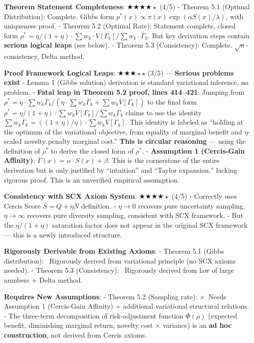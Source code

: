 \documentclass[
  12pt,
]{article}
\begin{document}
\textbf{Theorem Statement Completeness}: $\bigstar\bigstar\bigstar\bigstar{\scriptstyle\star}$ (4/5)
- Theorem 5.1 (Optimal Distribution): Complete. Gibbs form $p^*(x) \propto \pi(x)\exp(\alpha S(x)/\lambda)$, with uniqueness proof.
- Theorem 5.2 (Optimal Rate): Statement complete, closed form $\rho^* = \eta/(1+\eta)\cdot\sum w_k\cdot V[\Gamma_k]/\sum w_k\cdot\bar{\Gamma}_k$. But key derivation steps contain \textbf{serious logical leaps} (see below).
- Theorem 5.3 (Consistency): Complete. $\sqrt{n}$-consistency, Delta method.

\textbf{Proof Framework Logical Leaps}: $\bigstar\bigstar\bigstar{\scriptstyle\star}{\scriptstyle\star}$ (3/5) --- \textbf{Serious problems exist}
- Lemma 1 (Gibbs solution) derivation is standard variational inference, no problem.
- \textbf{Fatal leap in Theorem 5.2 proof, lines 414--421}: Jumping from $\rho^* = \eta\cdot\sum w_k\bar{\Gamma}_k/(\eta\cdot\sum w_k\bar{\Gamma}_k + \sum w_k V[\Gamma_k])$ to the final form $\rho^* = \eta/(1+\eta)\cdot\sum w_k V[\Gamma_k]/\sum w_k\bar{\Gamma}_k$ claims to use the identity $\sum w_k\bar{\Gamma}_k = ((1+\eta)/\eta)\cdot\sum w_k V[\Gamma_k]$. This identity is labeled as ``holding at the optimum of the variational objective, from equality of marginal benefit and $\eta$-scaled novelty penalty marginal cost.'' \textbf{This is circular reasoning} --- using the definition of $\rho^*$ to derive the closed form of $\rho^*$.
- \textbf{Assumption 1 (Cercis-Gain Affinity)}: $\bar{\Gamma}(x) = \alpha\cdot S(x) + \beta$. This is the cornerstone of the entire derivation but is only justified by ``intuition'' and ``Taylor expansion,'' lacking rigorous proof. This is an unverified empirical assumption.

\textbf{Consistency with SCX Axiom System}: $\bigstar\bigstar\bigstar\bigstar{\scriptstyle\star}$ (4/5)
- Correctly uses Cercis Score $S=Q+\eta N$ definition.
- $\eta\to 0$ recovers pure uncertainty sampling, $\eta\to\infty$ recovers pure diversity sampling, consistent with SCX framework.
- But the $\eta/(1+\eta)$ saturation factor does not appear in the original SCX framework --- this is a newly introduced structure.

\textbf{Rigorously Derivable from Existing Axioms}:
- Theorem 5.1 (Gibbs distribution): \checkmark\ Rigorously derived from variational principle (no SCX axioms needed).
- Theorem 5.3 (Consistency): \checkmark\ Rigorously derived from law of large numbers + Delta method.

\textbf{Requires New Assumptions}:
- Theorem 5.2 (Sampling rate): $\times$\ Needs Assumption 1 (Cercis-Gain Affinity) + additional variational structural relations.
- The three-term decomposition of risk-adjustment function $\Phi(\rho)$ (expected benefit, diminishing marginal return, novelty cost $\times$ variance) is an \textbf{ad hoc construction}, not derived from Cercis axioms.
\end{document}
